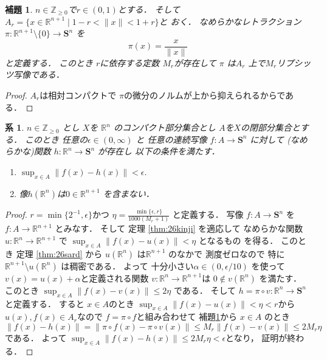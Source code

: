 \documentclass[leqno, a4paper, 12pt]{jsarticle}
\newtheorem{cor}[thm]{系}
\newtheorem{lem}[thm]{補題}
\newcommand{\zz}{\mathbb{Z}}
\newcommand{\rr}{\mathbb{R}}
\newcommand{\mysphere}[1]{\mathbf{S}^{#1}}
\begin{document}
\begin{lem}\label{lem:retractnameraka}
$n\in \zz_{\ge 0}$で$r\in (0, 1)$とする．
そして
$A_{r}=\{x\in \rr^{n+1}\mid 1-r<\lVert x\rVert<1+r\}$と
おく．
なめらかなレトラクション
$\pi \colon \rr^{n+1}\setminus \{0\}\to \mysphere{n}$
を
\[
\pi(x)=\frac{x}{\lVert x\rVert}
\]
と定義する．
このとき
$r$に依存する定数
$M_{r}$が存在して
$\pi$
は$A_{r}$
上で$M_{r}$リプシッツ写像である．
\end{lem}
\begin{proof}
$A_{r}$は相対コンパクトで
$\pi$の微分のノルムが上から抑えられるからである．
\end{proof}

\begin{cor}\label{cor:extspnameraka}
$n\in \zz_{\ge 0}$
とし
$X$を
$\rr^{n}$
のコンパクト部分集合とし
$A$を$X$の閉部分集合とする．
このとき
任意の$\epsilon \in (0, \infty)$
と
任意の連続写像
$f\colon A\to \mysphere{n}$
に対して
(なめらかな)関数
$h\colon \rr^{n}\to \mysphere{n}$
が存在し
以下の条件を満たす．
\begin{enumerate}
\item 
$\sup_{x\in A}\lVert f(x) -h(x) \rVert<\epsilon$. 
\item 
像$h(\rr^{n})$は$0\in \rr^{n+1}$
を含まない．
\end{enumerate}
\end{cor}
\begin{proof}
$r=\min\{2^{-1}, \epsilon\}$かつ
$\eta=\frac{\min\{\epsilon, r\}}{1000(M_{r}+1)}$
と定義する．
写像
$f\colon A\to \mysphere{n}$ 
を
$f\colon A\to \rr^{n+1}$
とみなす．
そして
定理
\ref{thm:26kinji}
を適応して
なめらかな関数
$u\colon \rr^{n}\to \rr^{n+1}$
で
$\sup_{x\in A}\lVert f(x)-u(x) \rVert<\eta$
となるもの
を得る．
このとき
定理
\ref{thm:26sard}
から
$u(\rr^{n})$
は$\rr^{n+1}$
のなかで
測度ゼロなので
特に$\rr^{n+1}\setminus u(\rr^{n})$
は稠密である．
よって
十分小さい$\alpha\in (0, \epsilon/10)$
を使って$v(x)=u(x)+\alpha$と定義される関数
$v\colon \rr^{n}\to \rr^{n+1}$は
$0\not\in v(\rr^{n})$
を満たす．
このとき
$\sup_{x\in A}\lVert f(x)-v(x)\lVert\le 2\eta$
である．
そして
$h=\pi\circ v\colon \rr^{n}\to \mysphere{n}$
と定義する．
すると
$x\in A$のとき
$\sup_{x\in A}\lVert f(x)-u(x) \rVert<\eta<r$から
$u(x), f(x)\in A_{r}$なので
$f=\pi\circ f$と組み合わせて
補題\ref{lem:retractnameraka}から
$x\in A$
のとき
\[
\rVert f(x)-h(x)\lVert =\rVert \pi \circ f(x)-\pi \circ v(x)\lVert\le M_{r}\lVert f(x)- v(x)\lVert\le 2M_{r}\eta
\]
である．
よって
$\sup_{x\in A}\lVert f(x)- h(x)\lVert \le 2M_{r}\eta<\epsilon$となり，
証明が終わる．
\end{proof}
\end{document}
